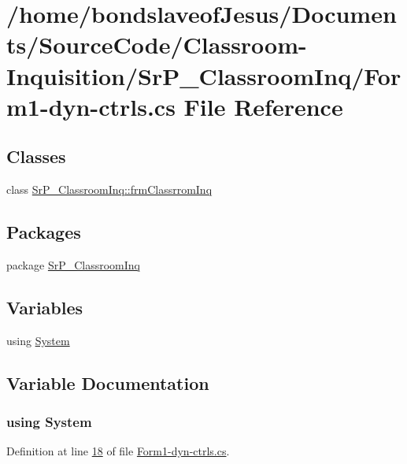 \hypertarget{_form1-dyn-ctrls_8cs}{
\section{/home/bondslaveof\-Jesus/\-Documents/\-Source\-Code/\-Classroom-\/\-Inquisition/\-Sr\-P\-\_\-\-Classroom\-Inq/\-Form1-\/dyn-\/ctrls.cs \-File \-Reference}
\label{_form1-dyn-ctrls_8cs}
}
\subsection*{\-Classes}
\begin{DoxyCompactItemize}
\item 
class \hyperlink{class_sr_p___classroom_inq_1_1frm_classrrom_inq}{\-Sr\-P\-\_\-\-Classroom\-Inq\-::frm\-Classrrom\-Inq}
\end{DoxyCompactItemize}
\subsection*{\-Packages}
\begin{DoxyCompactItemize}
\item 
package \hyperlink{namespace_sr_p___classroom_inq}{\-Sr\-P\-\_\-\-Classroom\-Inq}
\end{DoxyCompactItemize}
\subsection*{\-Variables}
\begin{DoxyCompactItemize}
\item 
﻿using \hyperlink{_form1-dyn-ctrls_8cs_a81a223a02c34d82b47199f08308847f2}{\-System}
\end{DoxyCompactItemize}


\subsection{\-Variable \-Documentation}
\hypertarget{_form1-dyn-ctrls_8cs_a81a223a02c34d82b47199f08308847f2}{
\subsubsection[{\-System}]{\setlength{\rightskip}{0pt plus 5cm}﻿using {\bf \-System}}}
\label{_form1-dyn-ctrls_8cs_a81a223a02c34d82b47199f08308847f2}


\-Definition at line \hyperlink{_form1-dyn-ctrls_8cs_source_l00018}{18} of file \hyperlink{_form1-dyn-ctrls_8cs_source}{\-Form1-\/dyn-\/ctrls.\-cs}.

